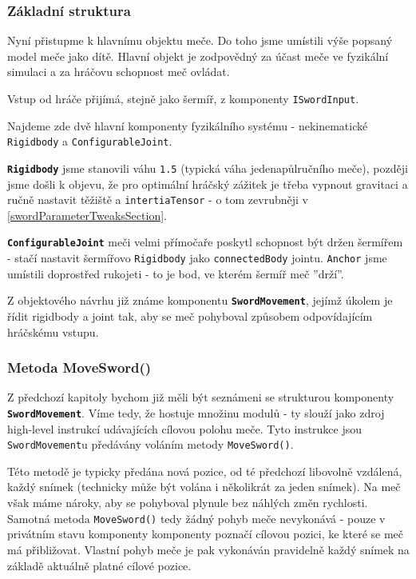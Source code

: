 \subsubsection*{Základní struktura} 

Nyní přistupme k hlavnímu objektu meče. Do toho jsme umístili výše popsaný model meče jako dítě. Hlavní objekt je zodpovědný za účast meče ve fyzikální simulaci a za hráčovu schopnost meč ovládat.

Vstup od hráče přijímá, stejně jako šermíř, z komponenty \texttt{ISwordInput}.

Najdeme zde dvě hlavní komponenty fyzikálního systému - nekinematické \texttt{Rigidbody} a \texttt{ConfigurableJoint}.

\textbf{\texttt{Rigidbody}} jsme stanovili váhu \texttt{1.5} (typická váha jedenapůlručního meče), později jsme došli k objevu, že pro optimální hráčský zážitek je třeba vypnout gravitaci a ručně nastavit těžiště a \texttt{intertiaTensor} - o tom zevrubněji v \ref{swordParameterTweaksSection}.

\textbf{\texttt{ConfigurableJoint}} meči velmi přímočaře poskytl schopnost být držen šermířem - stačí nastavit šermířovo \texttt{Rigidbody} jako \texttt{connectedBody} jointu. \texttt{Anchor} jsme umístili doprostřed rukojeti - to je bod, ve kterém šermíř meč ''drží''. 

Z objektového návrhu již známe komponentu \textbf{\texttt{SwordMovement}}, jejímž úkolem je řídit rigidbody a joint tak, aby se meč pohyboval způsobem odpovídajícím hráčskému vstupu.


\subsubsection*{Metoda MoveSword()} \label{swordMovementMoveSwordImplementationSubsection}

Z předchozí kapitoly bychom již měli být seznámeni se strukturou komponenty \textbf{\texttt{SwordMovement}}. Víme tedy, že hostuje množinu modulů - ty slouží jako zdroj high-level instrukcí udávajících cílovou polohu meče. Tyto instrukce jsou \texttt{SwordMovement}u předávány voláním metody \texttt{MoveSword()}.

Této metodě je typicky předána nová pozice, od té předchozí libovolně vzdálená, každý snímek (technicky může být volána i několikrát za jeden snímek). Na meč však máme nároky, aby se pohyboval plynule bez náhlých změn rychlosti. Samotná metoda \texttt{MoveSword()} tedy žádný pohyb meče nevykonává - pouze v privátním stavu komponenty komponenty poznačí cílovou pozici, ke které se meč má přibližovat. Vlastní pohyb meče je pak vykonáván pravidelně každý snímek na základě aktuálně platné cílové pozice.

